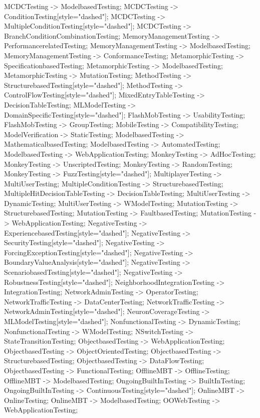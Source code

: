 \documentclass{article}
\begin{document}
{MCDCTesting -> ModelbasedTesting;
MCDCTesting -> ConditionTesting[style="dashed"];
MCDCTesting -> MultipleConditionTesting[style="dashed"];
MCDCTesting -> BranchConditionCombinationTesting;
MemoryManagementTesting -> PerformancerelatedTesting;
MemoryManagementTesting -> ModelbasedTesting;
MemoryManagementTesting -> ConformanceTesting;
MetamorphicTesting -> SpecificationbasedTesting;
MetamorphicTesting -> ModelbasedTesting;
MetamorphicTesting -> MutationTesting;
MethodTesting -> StructurebasedTesting[style="dashed"];
MethodTesting -> ControlFlowTesting[style="dashed"];
MixedEntryTableTesting -> DecisionTableTesting;
MLModelTesting -> DomainSpecificTesting[style="dashed"];
FlashMobTesting -> UsabilityTesting;
FlashMobTesting -> GroupTesting;
MobileTesting -> CompatibilityTesting;
ModelVerification -> StaticTesting;
ModelbasedTesting -> MathematicalbasedTesting;
ModelbasedTesting -> AutomatedTesting;
ModelbasedTesting -> WebApplicationTesting;
MonkeyTesting -> AdHocTesting;
MonkeyTesting -> UnscriptedTesting;
MonkeyTesting -> RandomTesting;
MonkeyTesting -> FuzzTesting[style="dashed"];
MultiplayerTesting -> MultiUserTesting;
MultipleConditionTesting -> StructurebasedTesting;
MultipleHitDecisionTableTesting -> DecisionTableTesting;
MultiUserTesting -> DynamicTesting;
MultiUserTesting -> WModelTesting;
MutationTesting -> StructurebasedTesting;
MutationTesting -> FaultbasedTesting;
MutationTesting -> WebApplicationTesting;
NegativeTesting -> ExperiencebasedTesting[style="dashed"];
NegativeTesting -> SecurityTesting[style="dashed"];
NegativeTesting -> ForcingExceptionTesting[style="dashed"];
NegativeTesting -> BoundaryValueAnalysis[style="dashed"];
NegativeTesting -> ScenariobasedTesting[style="dashed"];
NegativeTesting -> RobustnessTesting[style="dashed"];
NeighborhoodIntegrationTesting -> IntegrationTesting;
NetworkAdminTesting -> OperatorTesting;
NetworkTrafficTesting -> DataCenterTesting;
NetworkTrafficTesting -> NetworkAdminTesting[style="dashed"];
NeuronCoverageTesting -> MLModelTesting[style="dashed"];
NonfunctionalTesting -> DynamicTesting;
NonfunctionalTesting -> WModelTesting;
NSwitchTesting -> StateTransitionTesting;
ObjectbasedTesting -> WebApplicationTesting;
ObjectbasedTesting -> ObjectOrientedTesting;
ObjectbasedTesting -> StructurebasedTesting;
ObjectbasedTesting -> DataFlowTesting;
ObjectbasedTesting -> FunctionalTesting;
OfflineMBT -> OfflineTesting;
OfflineMBT -> ModelbasedTesting;
OngoingBuiltInTesting -> BuiltInTesting;
OngoingBuiltInTesting -> ContinuousTesting[style="dashed"];
OnlineMBT -> OnlineTesting;
OnlineMBT -> ModelbasedTesting;
OOWebTesting -> WebApplicationTesting;
}
\end{document}
